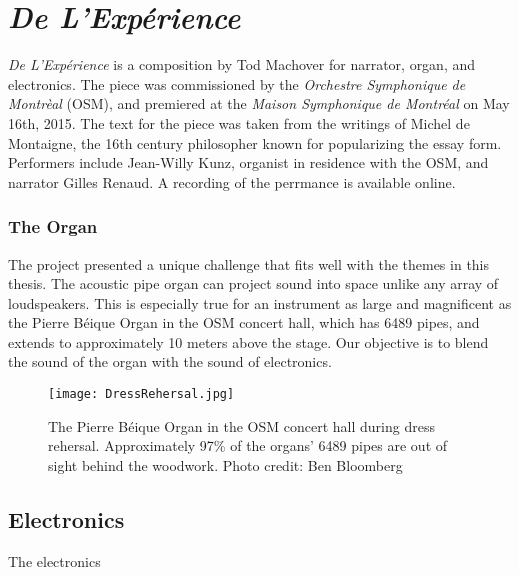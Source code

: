 \clearpage
\chapter{\textit{De L'Exp\'{e}rience}}
\label{ch:experience}

\textit{De L'Exp\'{e}rience} is a composition by Tod Machover for
narrator, organ, and electronics. The piece was commissioned by the
\textit{Orchestre Symphonique de Montr\`{e}al} (OSM), and premiered at
the \textit{Maison Symphonique de Montr\'{e}al} on May 16th, 2015. The
text for the piece was taken from the writings of Michel de Montaigne,
the 16th century philosopher known for popularizing the essay form.
Performers include Jean-Willy Kunz, organist in residence with the
OSM, and narrator Gilles Renaud. A recording of the perrmance is
available
online.


\subsection{The Organ}
\label{sec:organ}
The project presented a unique challenge that fits well with the
themes in this thesis. The acoustic pipe organ can project sound into
space unlike any array of loudspeakers. This is especially true for an
instrument as large and magnificent as the Pierre B\'{e}ique Organ in
the OSM concert hall, which has 6489 pipes, and extends to
approximately 10 meters above the stage. Our objective is to blend
the sound of the organ with the sound of electronics. 

\begin{figure*}[]
  \texttt{[image: DressRehersal.jpg]}
  \caption{The Pierre B\'{e}ique Organ in the OSM concert hall during
    dress rehersal. Approximately 97\% of the organs' 6489 pipes are
    out of sight behind the woodwork. Photo credit: Ben Bloomberg}
  \label{fig:le-corbusier-sketch}
\end{figure*}


\section{Electronics}
\label{sec:electronics}
The electronics 






